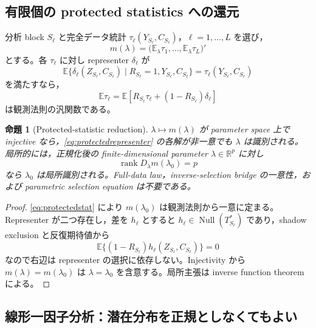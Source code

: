 \documentclass[11pt,a4paper]{ltjsarticle}
\newtheorem{proposition}{命題}[section]
\theoremstyle{remark}
\newcommand{\E}{\mathbb E}
\newcommand{\R}{\mathbb R}
\newcommand{\Null}{\operatorname{Null}}
\newcommand{\rank}{\operatorname{rank}}
\begin{document}
\subsection{有限個の protected statistics への還元}
分析 block $S_\ell$ と完全データ統計 $\tau_\ell(Y_{S_\ell},C_{S_\ell})$，$\ell=1,\ldots,L$ を選び，
\[
m(\lambda)
=\bigl(\E_\lambda\tau_1,\ldots,\E_\lambda\tau_L\bigr)'
\]
とする。各 $\tau_\ell$ に対し representer $\delta_\ell$ が
\begin{equation}
\E\{\delta_\ell(Z_{S_\ell},C_{S_\ell})\mid
R_{S_\ell}=1,Y_{S_\ell},C_{S_\ell}\}
=\tau_\ell(Y_{S_\ell},C_{S_\ell})
\label{eq:protectedrepresenter}
\end{equation}
を満たすなら，
\begin{equation}
\E\tau_\ell
=\E\left[R_{S_\ell}\tau_\ell
 +(1-R_{S_\ell})\delta_\ell\right]
\label{eq:protectedstat}
\end{equation}
は観測法則の汎関数である。

\begin{proposition}[Protected-statistic reduction]\label{prop:protectedreduction}
$\lambda\mapsto m(\lambda)$ が parameter space 上で injective なら，\eqref{eq:protectedrepresenter} の各解が非一意でも $\lambda$ は識別される。局所的には，正規化後の finite-dimensional parameter $\lambda\in\R^p$ に対し
\[
\rank D_\lambda m(\lambda_0)=p
\]
なら $\lambda_0$ は局所識別される。Full-data law，inverse-selection bridge の一意性，および parametric selection equation は不要である。
\end{proposition}

\begin{proof}
\eqref{eq:protectedstat} により $m(\lambda_0)$ は観測法則から一意に定まる。Representer が二つ存在し，差を $h_\ell$ とすると $h_\ell\in\Null(T_{S_\ell}^*)$ であり，shadow exclusion と反復期待値から
\[
\E\{(1-R_{S_\ell})h_\ell(Z_{S_\ell},C_{S_\ell})\}=0
\]
なので右辺は representer の選択に依存しない。Injectivity から $m(\lambda)=m(\lambda_0)$ は $\lambda=\lambda_0$ を含意する。局所主張は inverse function theorem による。
\end{proof}

\subsection{線形一因子分析：潜在分布を正規としなくてもよい}
\end{document}
